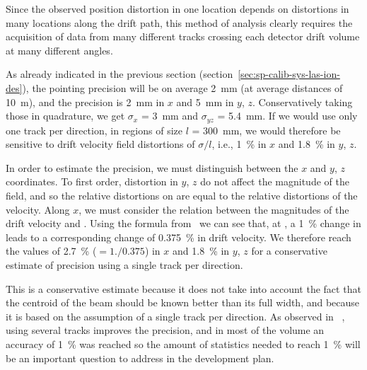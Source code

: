 Since the observed position distortion in one location depends on \efield distortions in many locations along the drift path, this method of analysis clearly requires the acquisition of data from many different tracks crossing each detector drift volume at many different angles. 

As already indicated in the previous section (section~\ref{sec:sp-calib-sys-las-ion-des}), the pointing precision will be on average \SI{2}{\milli\m} (at average distances of \SI{10}{\m}), and the  precision is \SI{2}{\milli\m} in $x$ and \SI{5}{\milli\m} in $y$, $z$. Conservatively taking those in quadrature, we get $\sigma_x$ =  \SI{3}{\milli\m} and $\sigma_{yz}$ = \SI{5.4}{\milli\m}.
If we would use only one track per direction, in regions of size $l$ = \SI{300}{\milli\m}, we would therefore be sensitive to drift velocity field distortions of $\sigma /l$, i.e., \SI{1}{\%} in $x$ and \SI{1.8}{\%} in $y$, $z$. 

In order to estimate the \efield precision, we must distinguish between the $x$ and $y$, $z$ coordinates. To first order, distortion in $y$, $z$ do not affect the magnitude of the field, and so the relative distortions on \efield are equal to the relative distortions of the velocity. Along $x$, we must consider the relation between the magnitudes of the drift velocity and \efield. Using the formula from~\cite{Li:2015rqa,Walkowiak:2000wf} we can see that, at \spmaxfield, a \SI{1}{\%} change in \efield leads to a corresponding change of \SI{0.375}{\%} in drift velocity. We therefore reach the values of \SI{2.7}{\%} ($=1./0.375$) in $x$ and \SI{1.8}{\%} in $y$, $z$ for a conservative estimate of \efield precision using a single track per direction. 

This is a conservative estimate because it does not take into account the fact that the centroid of the beam should be known better than its full width, and because it is based on the assumption of a single track per direction.  
As observed in ~\cite{bib:uBlaser2019}, using several tracks improves the precision, and in most of the volume an accuracy of \SI{1}{\%} was reached so the amount of statistics needed to reach \SI{1}{\%} will be an important question to address in the development plan. 









